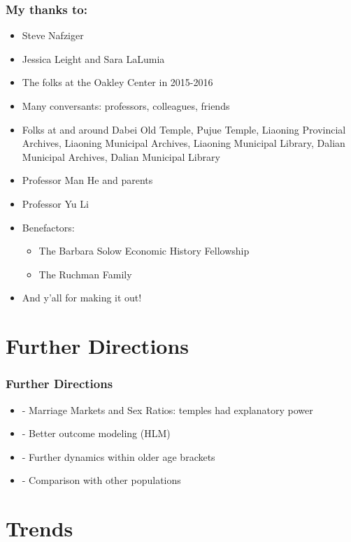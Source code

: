 \begin{frame}
\frametitle{My thanks to:}

\begin{itemize}

\item Steve Nafziger\\
\bigskip
\item Jessica Leight and Sara LaLumia\\
\item The folks at the Oakley Center in 2015-2016
\item Many conversants: professors, colleagues, friends
\item Folks at and around Dabei Old Temple, Pujue Temple, Liaoning Provincial Archives, Liaoning Municipal Archives, Liaoning Municipal Library, Dalian Municipal Archives, Dalian Municipal Library
\item Professor Man He and parents
\item Professor Yu Li
\item Benefactors:
\begin{itemize}
\item The Barbara Solow Economic History Fellowship
\item The Ruchman Family
\end{itemize}
\pause
\item And y'all for making it out!
\end{itemize}


\end{frame}


\appendix
\section{Further Directions}
\begin{frame}
\frametitle{Further Directions}

\begin{itemize}
\item - Marriage Markets and Sex Ratios: temples had explanatory power\\
\item - Better outcome modeling (HLM)
\item - Further dynamics within older age brackets
\item - Comparison with other populations
\end{itemize}


\end{frame}

\section{Trends}

